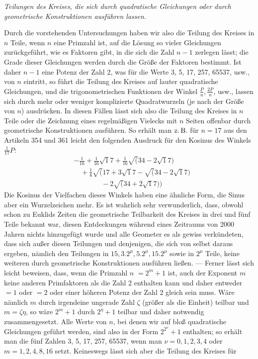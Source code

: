 \begin{center}\textit{Teilungen des Kreises, die sich durch quadratische Gleichungen oder durch\\geometrische Konstruktionen ausführen lassen.}\end{center}


Durch die vorstehenden Untersuchungen haben wir also die Teilung des Kreises in \(n\) Teile, wenn \(n\) eine Primzahl ist, auf die Lösung so vieler Gleichungen zurückgeführt, wie es Faktoren gibt, in die sich die Zahl \(n-1\) zerlegen lässt; die Grade dieser Gleichungen werden durch die Größe der Faktoren bestimmt. Ist daher \(n-1\) eine Potenz der Zahl 2, was für die Werte 3, 5, 17, 257, 65537, usw., von \(n\) eintritt, so führt die Teilung des Kreises auf lauter quadratische Gleichungen, und die trigonometrischen Funktionen der Winkel \(\frac Pn,\allowbreak \frac{2P}n\), usw., lassen sich durch mehr oder weniger komplizierte Quadratwurzeln (je nach der Größe von \(n\)) ausdrücken. In diesen Fällen lässt sich also die Teilung des Kreises in \(n\) Teile oder die Zeichnung eines regelmäßigen Vielecks mit \(n\) Seiten offenbar durch geometrische Konstruktionen ausführen. So erhält man \(\text{z.\,B.}\) für \(n=17\) aus den Artikeln 354 und 361 leicht den folgenden Ausdruck für den Kosinus des Winkels \(\tfrac1{17}P\): \[\begin{aligned}&-\tfrac1{16}+\tfrac1{16}\surd17+\tfrac1{16}\surd(34-2\surd17)\\&\quad+\tfrac18\surd(17+3\surd17-\surd(34-2\surd17)\\&\qquad\qquad-2\surd(34+2\surd17))\end{aligned}\] Die Kosinus der Vielfachen dieses Winkels haben eine ähnliche Form, die Sinus aber ein Wurzelzeichen mehr. Es ist wahrlich sehr verwunderlich, dass, obwohl schon zu Euklids Zeiten die geometrische Teilbarkeit des Kreises in drei und fünf Teile bekannt war, diesen Entdeckungen während eines Zeitraums von 2000 Jahren nichts hinzugefügt wurde und alle Geometer es als gewiss verkündeten, dass sich außer diesen Teilungen und denjenigen, die sich von selbst daraus ergeben, nämlich den Teilungen in \(15,\allowbreak 3.2^\mu,\allowbreak 5.2^\mu,\allowbreak 15.2^\mu\) sowie in \(2^\mu\) Teile, keine weiteren durch geometrische Konstruktionen ausführen ließen. — Ferner lässt sich leicht beweisen, dass, wenn die Primzahl \(n\) \(=2^m+1\) ist, auch der Exponent \(m\) keine anderen Primfaktoren als die Zahl 2 enthalten kann und daher entweder \(=1\) oder \(=2\) oder einer höheren Potenz der Zahl 2 gleich sein muss. Wäre nämlich \(m\) durch irgendeine ungerade Zahl \(\zeta\) (größer als die Einheit) teilbar und \(m=\zeta\eta\), so wäre \(2^m+1\) durch \(2^\eta+1\) teilbar und daher notwendig zusammengesetzt. Alle Werte von \(n\), bei denen wir auf bloß quadratische Gleichungen geführt werden, sind also in der Form \(2^{2^\nu}+1\) enthalten; so erhält man die fünf Zahlen 3, 5, 17, 257, 65537, wenn man \(\nu=0,\allowbreak 1,\allowbreak 2,\allowbreak 3,\allowbreak 4\) oder \(m=1,\allowbreak 2,\allowbreak 4,\allowbreak 8,\allowbreak 16\) setzt. Keineswegs lässt sich aber die Teilung des Kreises für 